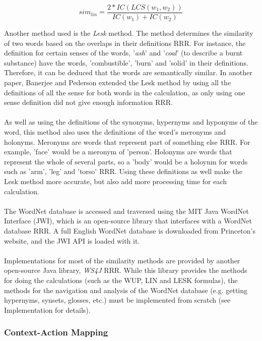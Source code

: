 \documentclass[12pt]{article}
\begin{document}
$$sim_{lin} = \frac{2*IC(LCS(w_1,w_2))}{IC(w_1)+IC(w_2)}$$

Another method used is the \textit{Lesk} method. The method determines the similarity of two words based on the overlaps in their definitions RRR. For instance, the definition for certain senses of the words, '\textit{ash}' and '\textit{coal}' (to describe a burnt substance) have the words, 'combustible', 'burn' and 'solid' in their definitions. Therefore, it can be deduced that the words are semantically similar. In another paper, Banerjee and Pederson extended the Lesk method by using all the definitions of all the sense for both words in the calculation, as only using one sense definition did not give enough information RRR.
\\
\\
As well as using the definitions of the synonyms, hypernyms and hyponyms of the word, this method also uses the definitions of the word's meronyms and holonyms. Meronyms are words that represent part of something else RRR. For example, 'face' would be a meronym of 'person'. Holonyms are words that represent the whole of several parts, so a 'body' would be a holoynm for words such as 'arm', 'leg' and 'torso' RRR. Using these definitions as well make the Lesk method more accurate, but also add more processing time for each calculation.
\\
\\
The WordNet database is accessed and traversed using the MIT Java WordNet Interface (JWI), which is an open-source library that interfaces with a WordNet database RRR. A full English WordNet database is downloaded from Princeton's website, and the JWI API is loaded with it.
\\
\\
Implementations for most of the similarity methods are provided by another open-source Java library, \textit{WS4J} RRR. While this library provides the methods for doing the calculations (such as the WUP, LIN and LESK formulas), the methods for the navigation and analysis of the WordNet database (e.g. getting hypernyms, synsets, glosses, etc.) must be implemented from scratch (see Implementation for details).

\subsubsection{Context-Action Mapping}
\end{document}
